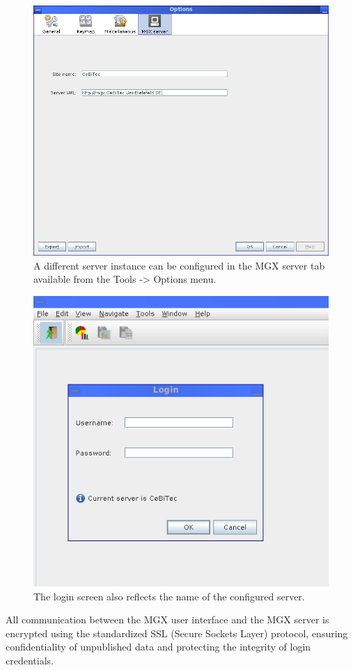 \begin{figure}[ht]
\centering
\includegraphics[width=.8\textwidth]{img/configure-site}
\caption[Server configuration:]{A different server instance can be configured in the MGX 
server tab available from the Tools -> Options menu.}
\label{config-site}
\end{figure}


\begin{figure}[ht]
\centering
\includegraphics[width=.8\textwidth]{img/login-screen}
\caption[Login screen:]{The login screen also reflects the name of the configured server.}
\label{login-screen}
\end{figure}

All communication between the MGX user interface and the MGX server is encrypted using
the standardized SSL (Secure Sockets Layer) protocol, ensuring confidentiality of 
unpublished data and protecting the integrity of login credentials.



